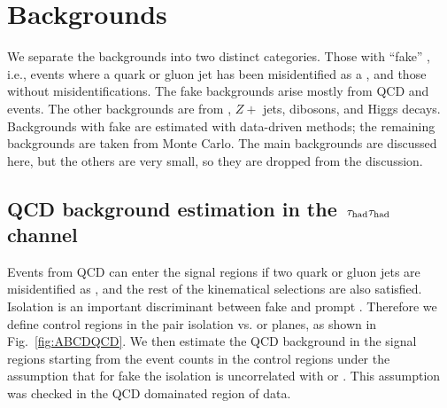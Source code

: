 \section{Backgrounds}
\label{sect:bkgLepTau}
We separate the backgrounds into two distinct categories.  Those with 
``fake'' \Tau, i.e., events where a quark or gluon jet has been misidentified
as a \Tau, and those without \Tau misidentifications.  
The fake \Tau backgrounds arise mostly from QCD and \wjets events.  The 
other backgrounds are from \ttbar, $Z+$ jets, dibosons, and Higgs decays.
Backgrounds with fake \Tau are estimated with data-driven methods; the 
remaining backgrounds are taken from Monte Carlo. The main backgrounds
are discussed here, but the others are very small, so they are dropped from the 
discussion.


\subsection{\texorpdfstring{QCD background estimation in the $\,\tau_{\rm had}\tau_{\rm had}$ channel}{QCD background estimation in the tau-tau channel}}

Events from QCD can enter the signal regions if two quark or gluon jets are 
misidentified as \Tau, and the rest of the kinematical selections are also 
satisfied.  Isolation is an important 
discriminant between fake \Tau and prompt \Tau.
Therefore we define control regions in the 
\Tau pair isolation vs. \mttwo or \SumMT 
planes, as shown in Fig.~\ref{fig:ABCDQCD}. We then estimate the QCD background
in the signal regions starting from the event counts in the
control regions under the assumption
that for fake \tauTau the isolation is uncorrelated with \mttwo or \SumMT.
This assumption was checked in the QCD domainated region of data.

